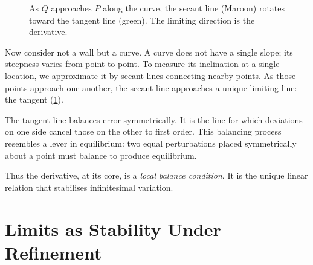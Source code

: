 \documentclass[12pt,openany]{book}
\begin{document}
\begin{figure}[H]
\centering
{}
\caption{As $Q$ approaches $P$ along the curve, the secant line (Maroon)
rotates toward the tangent line (green). The limiting direction is the
derivative.}
\label{fig:secant-tangent}
\end{figure}

Now consider not a wall but a curve. A curve does not have a single slope; its
steepness varies from point to point. To measure its inclination at a single
location, we approximate it by secant lines connecting nearby points. As those
points approach one another, the secant line approaches a unique limiting line:
the tangent (\cref{fig:secant-tangent}).

The tangent line balances error symmetrically. It is the line for which
deviations on one side cancel those on the other to first order. This balancing
process resembles a lever in equilibrium: two equal perturbations placed
symmetrically about a point must balance to produce equilibrium.

Thus the derivative, at its core, is a \emph{local balance condition}. It is
the unique linear relation that stabilises infinitesimal variation.

\section{Limits as Stability Under Refinement}
\end{document}
